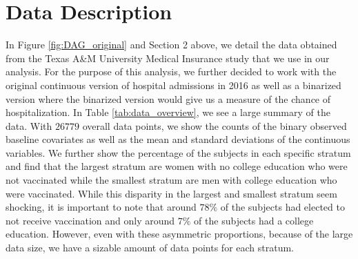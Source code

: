 \documentclass[english, 12pt]{article}
\begin{document}
\section{Data Description}
In Figure \ref{fig:DAG_original} and Section 2 above, we detail the data obtained from the Texas A\&M University Medical Insurance study that we use in our analysis. For the purpose of this analysis, we further decided to work with the original continuous version of hospital admissions in 2016 as well as a binarized version where the binarized version would give us a measure of the chance of hospitalization. In Table \ref{tab:data_overview}, we see a large summary of the data. With $26779$ overall data points, we show the counts of the binary observed baseline covariates as well as the mean and standard deviations of the continuous variables. We further show the percentage of the subjects in each specific stratum and find that the largest stratum are women with no college education who were not vaccinated while the smallest stratum are men with college education who were vaccinated. While this disparity in the largest and smallest stratum seem shocking, it is important to note that around $78\%$ of the subjects had elected to not receive vaccination and only around $7\%$ of the subjects had a college education. However, even with these asymmetric proportions, because of the large data size, we have a sizable amount of data points for each stratum.
\end{document}
